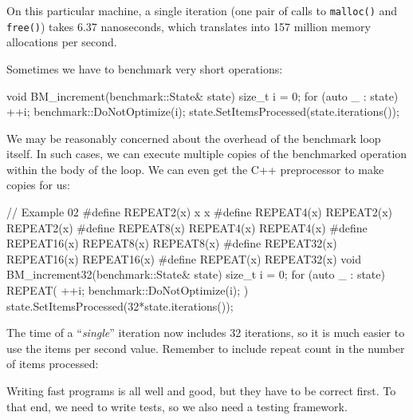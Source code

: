 
On this particular machine, a single iteration (one pair of calls to \texttt{malloc()} and \texttt{free()}) takes 6.37 nanoseconds, which translates into 157 million memory allocations per second.

Sometimes we have to benchmark very short operations:

\begin{code}
void BM_increment(benchmark::State& state) {
  size_t i = 0;
  for (auto _ : state) {
    ++i;
    benchmark::DoNotOptimize(i);
  }
  state.SetItemsProcessed(state.iterations());
}
\end{code}

We may be reasonably concerned about the overhead of the benchmark loop itself. In such cases, we can execute multiple copies of the benchmarked operation within the body of the loop. We can even get the C++ preprocessor to make copies for us:

\begin{code}
// Example 02
#define REPEAT2(x) x x
#define REPEAT4(x) REPEAT2(x) REPEAT2(x)
#define REPEAT8(x) REPEAT4(x) REPEAT4(x)
#define REPEAT16(x) REPEAT8(x) REPEAT8(x)
#define REPEAT32(x) REPEAT16(x) REPEAT16(x)
#define REPEAT(x) REPEAT32(x)
void BM_increment32(benchmark::State& state) {
  size_t i = 0;
  for (auto _ : state) {
    REPEAT(
      ++i;
      benchmark::DoNotOptimize(i);
    )
  }
  state.SetItemsProcessed(32*state.iterations());
}
\end{code}

The time of a ``\emph{single}'' iteration now includes 32 iterations, so it is much easier to use the items per second value. Remember to include repeat count in the number of items processed:


Writing fast programs is all well and good, but they have to be correct first. To that end, we need to write tests, so we also need a testing framework.

